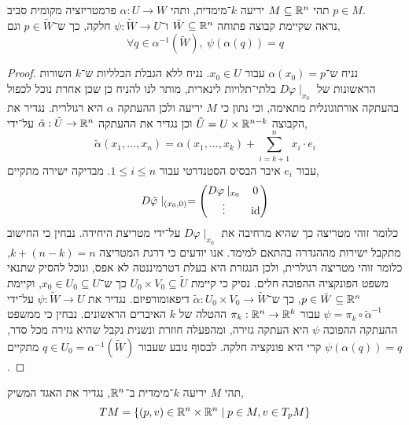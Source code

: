 \question{}
תהי $M \subseteq \mathbb{R}^n$ יריעה $k$־מימדית,
ותהי $\alpha : U \to W$ פרמטריזציה מקומית סביב $p \in M$. \\
נראה שקיימת קבוצה פתוחה $\tilde{W} \subseteq \mathbb{R}^n$ ו־$\psi : \tilde{W} \to U$ חלקה,
כך ש־$p \in \tilde{W}$ וגם,
\[
	\forall q \in \alpha^{-1}(\tilde{W}),\ 
	\psi(\alpha(q)) = q
\]
\begin{proof}
	נניח ש־$\alpha(x_0) = p$ עבור $x_0 \in U$.
	נניח ללא הגבלת הכלליות ש־$k$ השורות הראשונות של $D \varphi \mid_{x_0}$ בלתי־תלויות לינארית,
	מותר לנו להניח כן שכן אחרת נוכל לכפול בהעתקה אורתוגונלית מתאימה, וכי נתון כי $M$ יריעה ולכן ההעתקה $\alpha$ היא רגולרית.
	נגדיר את הקבוצה $\tilde{U} = U \times \mathbb{R}^{n - k}$ וכן נגדיר את ההעתקה $\tilde{\alpha} : \tilde{U} \to \mathbb{R}^n$ על־ידי,
	\[
		\tilde{\alpha}(x_1, \ldots, x_n)
		= \alpha(x_1, \ldots, x_k) + \sum_{i = k + 1}^n x_i \cdot e_i
	\]
	עבור $e_i$ איבר הבסיס הסטנדרטי עבור $1 \le i \le n$.
	מבדיקה ישירה מתקיים,
	\[
		D \tilde{\varphi} \mid_{(x_0, 0)}
		= \begin{pmatrix}
			D \varphi \mid_{x_0} & 0 \\
			\vdots & \operatorname{id}
		\end{pmatrix}
	\]
	כלומר זוהי מטריצה כך שהיא מרחיבה את $D \varphi \mid_{x_0}$ על־ידי מטריצת היחידה.
	נבחין כי החישוב מתקבל ישירות מההגדרה בהתאם למימד.
	אנו יודעים כי דרגת המטריצה $k + (n - k) = n$, כלומר זוהי מטריצה רגולרית, ולכן הנגזרת היא בעלת דטרמיננטה לא אפס, ונוכל להסיק שתנאי משפט הפונקציה ההפוכה חלים.
	נסיק כי קיימת $U_0 \times V_0 \subseteq \tilde{U}$ כך ש־$x_0 \in U_0 \subseteq U$, וקיימת $p \in \tilde{W} \subseteq \mathbb{R}^n$, כך ש־$\tilde{\alpha} : U_0 \times V_0 \to \tilde{W}$ דיפאומורפיזם.
	נגדיר את $\psi : \tilde{W} \to U$ על־ידי $\psi = \pi_k \circ \tilde{\alpha}^{-1}$ עבור $\pi_k : \mathbb{R}^n \to \mathbb{R}^k$ ההטלה של $k$ האיברים הראשונים.
	נבחין כי ממשפט ההעתקה ההפוכה $\psi$ היא העתקה גזירה, ומהפעלה חוזרת ונשנית נקבל שהיא גזירה מכל סדר, קרי היא פונקציה חלקה.
	לבסוף נובע שעבור $q \in U_0 = \alpha^{-1}(\tilde{W})$ מתקיים $\psi(\alpha(q)) = q$.
\end{proof}

\question{}
תהי $M$ יריעה $k$־מימדית ב־$\mathbb{R}^n$, נגדיר את האגד המשיק,
\[
	TM
	= \{ (p, v) \in \mathbb{R}^n \times \mathbb{R}^n \mid p \in M, v \in T_p M \}
\]

